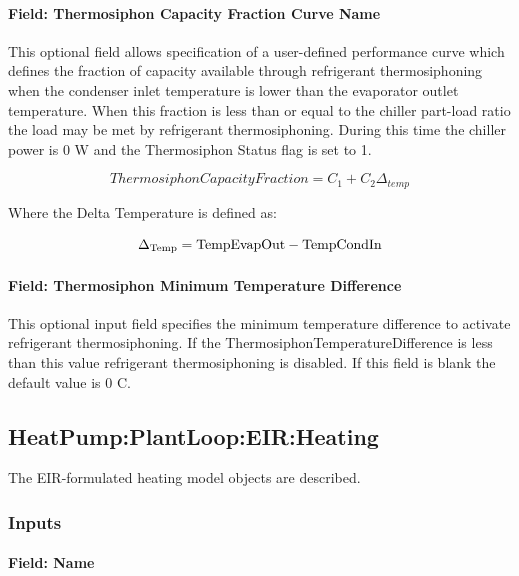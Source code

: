 \paragraph{Field: Thermosiphon Capacity Fraction Curve Name}\label{thermosiphon-capacity-fraction-curve-name1}

This optional field allows specification of a user-defined performance curve which defines the fraction of capacity available through refrigerant thermosiphoning when the condenser inlet temperature is lower than the evaporator outlet temperature. When this fraction is less than or equal to the chiller part-load ratio the load may be met by refrigerant thermosiphoning. During this time the chiller power is 0 W and the Thermosiphon Status flag is set to 1.

\begin{equation}
    ThermosiphonCapacityFraction = {C_1} + {C_2}{\Delta_{temp}}
\end{equation}

Where the Delta Temperature is defined as:

\begin{equation}
{\Delta_{{\rm{Temp}}}}
    = {\rm{TempEvapOut  -  TempCondIn }}
\end{equation}

\paragraph{Field: Thermosiphon Minimum Temperature Difference}\label{thermosiphon-minimum-temperature-difference1}

This optional input field specifies the minimum temperature difference to activate refrigerant thermosiphoning. If the ThermosiphonTemperatureDifference is less than this value refrigerant thermosiphoning is disabled. If this field is blank the default value is 0 C.

\subsection{HeatPump:PlantLoop:EIR:Heating}\label{plhp_eir_heating}

The EIR-formulated heating model objects are described.

\subsubsection{Inputs}\label{plhp_eir_heating_inputs}

\paragraph{Field: Name}\label{plhp_eir_heating_inputs_name}


